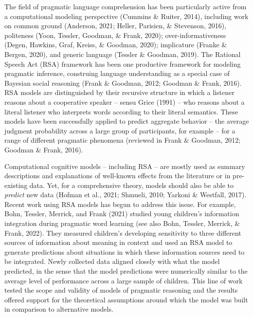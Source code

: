 \documentclass[
  man,mask,floatsintext]{apa6}
\begin{document}
The field of pragmatic language comprehension has been particularly active from a computational modeling perspective (Cummins \& Ruiter, 2014), including work on common ground (Anderson, 2021; Heller, Parisien, \& Stevenson, 2016), politeness (Yoon, Tessler, Goodman, \& Frank, 2020); over-informativeness (Degen, Hawkins, Graf, Kreiss, \& Goodman, 2020); implicature (Franke \& Bergen, 2020), and generic language (Tessler \& Goodman, 2019). The Rational Speech Act (RSA) framework has been one productive framework for modeling pragmatic inference, construing language understanding as a special case of Bayesian social reasoning (Frank \& Goodman, 2012; Goodman \& Frank, 2016). RSA models are distinguished by their recursive structure in which a listener reasons about a cooperative speaker -- sensu Grice (1991) -- who reasons about a literal listener who interprets words according to their literal semantics. These models have been successfully applied to predict aggregate behavior -- the average judgment probability across a large group of participants, for example -- for a range of different pragmatic phenomena (reviewed in Frank \& Goodman, 2012; Goodman \& Frank, 2016).

Computational cognitive models -- including RSA -- are mostly used as summary descriptions and explanations of well-known effects from the literature or in pre-existing data. Yet, for a comprehensive theory, models should also be able to \emph{predict} new data (Hofman et al., 2021; Shmueli, 2010; Yarkoni \& Westfall, 2017). Recent work using RSA models has begun to address this issue. For example, Bohn, Tessler, Merrick, and Frank (2021) studied young children's information integration during pragmatic word learning (see also Bohn, Tessler, Merrick, \& Frank, 2022). They measured children's developing sensitivity to three different sources of information about meaning in context and used an RSA model to generate predictions about situations in which these information sources need to be integrated. Newly collected data aligned closely with what the model predicted, in the sense that the model predictions were numerically similar to the average level of performance across a large sample of children. This line of work tested the scope and validity of models of pragmatic reasoning and the results offered support for the theoretical assumptions around which the model was built in comparison to alternative models.
\end{document}
